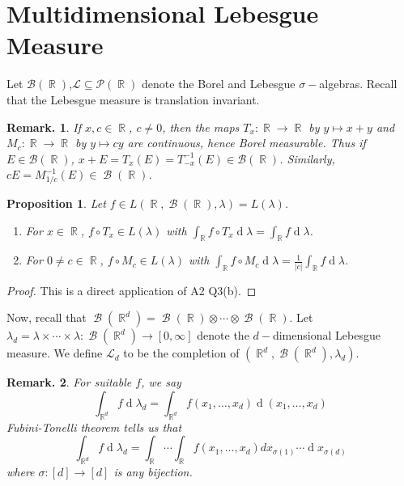 \documentclass[12pt, a4paper]{memoir}
\DeclareMathOperator{\R}{{\mathbb{R}}}
\newtheorem{proposition}[theorem]{Proposition}
\theoremstyle{nonumberplain}
\newtheorem{remark}{Remark.}
\newtheorem{proof}{Proof}
\DeclareMathOperator{\B}{\mathcal{B}}
\renewcommand{\d}[1]{\ensuremath{\operatorname{d}\!{#1}}} %
\begin{document}
\section{Multidimensional Lebesgue Measure}
Let $\mathcal{B}(\R)$,$\mathcal{L}\subseteq\mathcal{P}(\R)$ denote the Borel and Lebesgue $\sigma-$algebras.
Recall that the Lebesgue measure is translation invariant.
\begin{remark}
    If $x,c\in\R$, $c\neq 0$, then the maps $T_x:\R\to\R$ by $y\mapsto x+y$ and $M_c:\R\to\R$ by $y\mapsto cy$ are continuous, hence Borel measurable.
    Thus if $E\in\mathcal{B}(\R)$, $x+E=T_x(E)=T_{-x}^{-1}(E)\in\mathcal{B}(\R)$.
    Similarly, $cE=M_{1/c}^{-1}(E)\in\B(\R)$.
\end{remark}
\begin{proposition}
    Let $f\in L(\R,\B(\R),\lambda)=L(\lambda)$.
    \begin{enumerate}[nolistsep,label=(\roman*)]
        \item For $x\in\R$, $f\circ T_x\in L(\lambda)$ with $\int_{\R}f\circ T_x\d{\lambda}=\int_{\R}f\d{\lambda}$.
        \item For $0\neq c\in\R$, $f\circ M_c\in L(\lambda)$ with $\int_{\R}f\circ M_c\d{\lambda}=\frac{1}{|c|}\int_{\R}f\d{\lambda}$.
    \end{enumerate}
\end{proposition}
\begin{proof}
    This is a direct application of A2 Q3(b).
\end{proof}
Now, recall that $\B(\R^d)=\B(\R)\otimes\cdots\otimes\B(\R)$.
Let $\lambda_d=\lambda\times\cdots\times\lambda:\B(\R^d)\to[0,\infty]$ denote the $d-$dimensional Lebesgue measure.
We define $\mathcal{L}_d$ to be the completion of $(\R^d,\B(\R^d),\lambda_d)$.
\begin{remark}
    For suitable $f$, we say
    \begin{equation*}
        \int_{\R^d}f\d{\lambda_d}=\int_{\R^d}f(x_1,\ldots,x_d)\d{(x_1,\ldots,x_d)}
    \end{equation*}
    Fubini-Tonelli theorem tells us that
    \begin{equation*}
        \int_{\R^d}f\d{\lambda_d}=\int_{\R}\cdots\int_{\R}f(x_1,\ldots,x_d)dx_{\sigma(1)}\cdots\d{x_{\sigma(d)}}
    \end{equation*}
    where $\sigma:[d]\to[d]$ is any bijection.
\end{remark}
\end{document}
